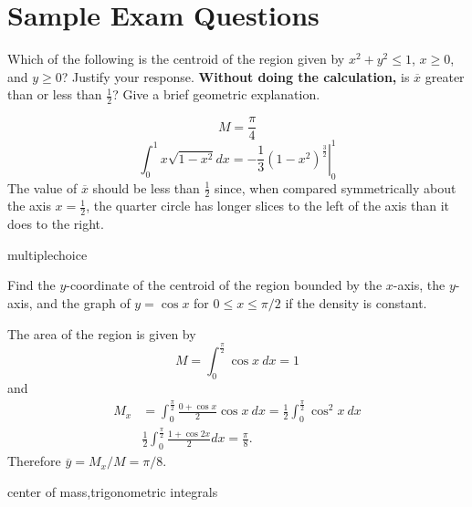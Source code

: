 \documentclass{ximera}
\begin{document}
\section*{Sample Exam Questions}

\begin{question}
Which of the following is  the centroid of the region given by $x^2 + y^2 \leq 1$, $x \geq 0$, and $y \geq 0$? Justify your response.  {\bf Without doing the calculation,} is $\overline{x}$ greater than or less than $\frac{1}{2}$? Give a brief geometric explanation.
\begin{multipleChoice}
\end{multipleChoice}

 \begin{feedback}\[ M = \frac{\pi}{4} \]
\[ \int_0^1 x \sqrt{1-x^2} dx = \left. - \frac{1}{3} (1-x^2)^\frac{3}{2} \right|_{0}^1 \]
The value of $\overline{x}$ should be less than $\frac{1}{2}$ since, when compared symmetrically about the axis $x=\frac{1}{2}$, the quarter circle has longer slices to the left of the axis than it does to the right.
\end{feedback}
\end{question}

\begin{question}[2015C.12]
\begin{type}
multiplechoice
\end{type}
Find the \(y\)-coordinate of the centroid of the region bounded by the \(x\)-axis, the \(y\)-axis, and the graph of \(y = \cos x\) for \(0 \leq x \leq \pi/2\) if the density is constant.
\begin{multiplechoice}
\end{multiplechoice}
\begin{feedback}
The area of the region is given by
\[ M = \int_0^{\frac{\pi}{2}} \cos x~dx = 1 \]
and 
\[\begin{aligned}
 M_x & = \int_0^{\frac{\pi}{2}} \frac{0 + \cos x}{2} \cos x~ dx = \frac{1}{2} \int_0^{\frac{\pi}{2}} \cos^2 x ~ dx \\
& \frac{1}{2} \int_0^{\frac{\pi}{2}} \frac{1 + \cos 2x}{2} dx = \frac{\pi}{8}. 
\end{aligned}\]
Therefore \(\overline{y} = M_x / M = \pi/8\).
\end{feedback}
\begin{keywords}
center of mass,trigonometric integrals
\end{keywords}
\end{question}
\end{document}
